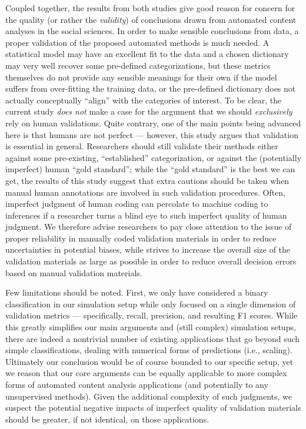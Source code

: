 \documentclass[man, 12pt, a4paper, nolmodern, noextraspace]{apa6}
\begin{document}
    Coupled together, the results from both studies give good reason for concern for the quality (or rather the \textit{validity}) of conclusions drawn from automated content analyses in the social sciences. In order to make sensible conclusions from data, a proper validation of the proposed automated methods is much needed. A statistical model may have an excellent fit to the data and a chosen dictionary may very well recover some pre-defined categorizations, but these metrics themselves do not provide any sensible meanings for their own if the model suffers from over-fitting the training data, or the pre-defined dictionary does not actually conceptually \enquote{align} with the categories of interest. To be clear, the current study \textit{does not} make a case for the argument that we should \textit{exclusively} rely on human validations. Quite contrary, one of the main points being advanced here is that humans are not perfect --- however, this study argues that validation is essential in general. Researchers should still validate their methods either against some pre-existing, \enquote{established} categorization, or against the (potentially imperfect) human \enquote{gold standard}; while the \enquote{gold standard} is the best we can get, the results of this study suggest that extra cautions should be taken when manual human annotations are involved in such validation procedures. Often, imperfect judgment of human coding can percolate to machine coding to inferences if a researcher turns a blind eye to such imperfect quality of human judgment. We therefore advise researchers to pay close attention to the issue of proper reliability in manually coded validation materials in order to reduce uncertainties in potential biases, while strives to increase the overall size of the validation materials as large as possible in order to reduce overall decision errors based on manual validation materials.    

    Few limitations should be noted. First, we only have considered a binary classification in our simulation setup while only focused on a single dimension of validation metrics --- specifically, recall, precision, and resulting F1 scores. While this greatly simplifies our main arguments and (still complex) simulation setups, there are indeed a nontrivial number of existing applications that go beyond such simple classifications, dealing with numerical forms of predictions (i.e., scaling). Ultimately our conclusion would be of course bounded to our specific setup, yet we reason that our core arguments can be equally applicable to more complex forms of automated content analysis applications (and potentially to any unsupervised methods). Given the additional complexity of such judgments, we suspect the potential negative impacts of imperfect quality of validation materials should be greater, if not identical, on those applications. 
\end{document}
